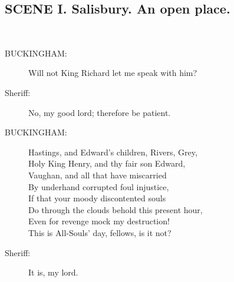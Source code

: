 \documentclass{article}
\begin{document}
\subsection*{SCENE I.  Salisbury. An open place.}
\\
\begin{description}
\item[BUCKINGHAM:] 
\hspace{1pt}Will not King Richard let me speak with him?\\
\end{description}
\begin{description}
\item[Sheriff:] 
\hspace{1pt}No, my good lord; therefore be patient.\\
\end{description}
\begin{description}
\item[BUCKINGHAM:] 
\hspace{1pt}Hastings, and Edward's children, Rivers, Grey,\\
\hspace{1pt}Holy King Henry, and thy fair son Edward,\\
\hspace{1pt}Vaughan, and all that have miscarried\\
\hspace{1pt}By underhand corrupted foul injustice,\\
\hspace{1pt}If that your moody discontented souls\\
\hspace{1pt}Do through the clouds behold this present hour,\\
\hspace{1pt}Even for revenge mock my destruction!\\
\hspace{1pt}This is All-Souls' day, fellows, is it not?\\
\end{description}
\begin{description}
\item[Sheriff:] 
\hspace{1pt}It is, my lord.\\
\end{description}
\end{document}
